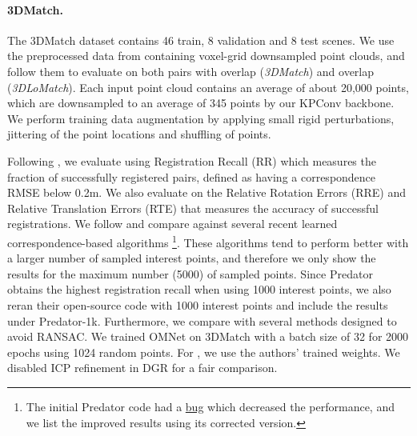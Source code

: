 \documentclass[10pt,twocolumn,letterpaper]{article}
\begin{document}
\paragraph{3DMatch.}
The 3DMatch dataset \cite{zeng20163dmatch} contains 46 train, 8 validation and 8 test scenes. We use the preprocessed data from \cite{huang2021predator} containing voxel-grid downsampled point clouds, and follow them to evaluate on both pairs with  overlap (\emph{3DMatch}) and  overlap (\emph{3DLoMatch}). Each input point cloud contains an average of about 20,000 points, which are downsampled to an average of 345 points by our KPConv backbone. We perform training data augmentation by applying small rigid perturbations, jittering of the point locations and shuffling of points.

Following \cite{choi2015robustrecon,huang2021predator,bai2020d3feat}, we evaluate using Registration Recall (RR) which measures the fraction of successfully registered pairs, defined as having a correspondence RMSE below 0.2m. We also evaluate on the Relative Rotation Errors (RRE) and Relative Translation Errors (RTE) that measures the accuracy of successful registrations.
We follow \cite{huang2021predator} and compare against several recent learned correspondence-based algorithms \cite{gojcic2019perfect,choy2019fcgf,bai2020d3feat,huang2021predator}\footnote{The initial Predator code had a \href{https://github.com/overlappredator/OverlapPredator/issues/15}{bug} which decreased the performance, and we list the improved results using its corrected version.}. These algorithms tend to perform better with a larger number of sampled interest points, and therefore we only show the results for the maximum number (5000) of sampled points. Since Predator \cite{huang2021predator} obtains the highest registration recall when using 1000 interest points, we also reran their open-source code with 1000 interest points and include the results under Predator-1k.
Furthermore, we compare with several methods \cite{xu2021omnet,choy2020dgr,cao2021pcam} designed to avoid RANSAC. We trained OMNet \cite{xu2021omnet} on 3DMatch with a batch size of 32 for 2000 epochs using 1024 random points. For \cite{choy2020dgr,cao2021pcam}, we use the authors' trained weights. We disabled ICP refinement in DGR \cite{choy2020dgr} for a fair comparison.
\end{document}
